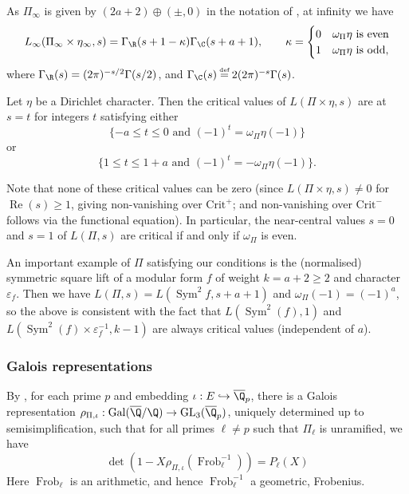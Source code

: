 \documentclass[10pt,reqno,a4paper]{amsart}
\newcommand{\GL}{\mathrm{GL}}
\begin{document}
As $\Pi_\infty$ is given by $(2a+2)\oplus(\pm,0)$ in the notation of \cite[\S3]{Kna94}, at infinity we have
\[
L_\infty(\Pi_\infty \times \eta_\infty, s) = \Gamma_\R(s + 1 - \kappa) \Gamma_{\C}(s + a + 1), \qquad \kappa = \begin{cases}0 & \omega_\Pi\eta\text{ is even}\\1 & \omega_\Pi\eta \text{ is odd,}\end{cases}
\]
where $\Gamma_{\R}(s) = (2\pi)^{-s/2}\Gamma(s/2)$, and $\Gamma_{\C}(s) \defeq 2(2\pi)^{-s}\Gamma(s)$.
\begin{proposition}
\label{prop:critical}
Let $\eta$ be a Dirichlet character. Then the critical values of $L(\Pi \times \eta, s)$ are at $s = t$ for integers $t$ satisfying either
\[ \{ -a \le t \le 0 \text{ and } (-1)^{t} = \omega_{\Pi}\eta(-1) \}\]
or
\[ \{ 1 \le t \le 1+a \text{ and } (-1)^{t} = -\omega_{\Pi}\eta(-1) \}.\]
\end{proposition}

Note that none of these critical values can be zero (since $L(\Pi \times \eta, s) \ne 0$ for $\operatorname{Re}(s) \ge 1$, giving non-vanishing over $\mathrm{Crit}^+$; and non-vanishing over $\mathrm{Crit}^-$ follows via the functional equation). In particular, the near-central values $s = 0$ and $s = 1$ of $L(\Pi, s)$ are critical if and only if $\omega_{\Pi}$ is even.

\begin{remark}
An important example of $\Pi$ satisfying our conditions is the (normalised) symmetric square lift of a modular form $f$ of weight $k = a + 2 \ge 2$ and character $\varepsilon_f$. Then we have $L(\Pi, s) = L(\operatorname{Sym}^2 f, s + a+1)$ and $\omega_{\Pi}(-1) = (-1)^a$, so the above is consistent with the fact that $L(\operatorname{Sym}^2(f), 1)$ and $L(\operatorname{Sym}^2(f) \times \varepsilon_f^{-1}, k-1)$ are always critical values (independent of $a$).
\end{remark}

\subsubsection{Galois representations}\label{sec:galois}
By \cite{HLTT}, for each prime $p$ and embedding $\iota: E \hookrightarrow \overline{\Q}_p$,  there is a Galois representation $\rho_{\Pi, \iota}: \operatorname{Gal}(\overline{\Q} / \Q) \to \GL_3(\overline{\Q}_p)$, uniquely determined up to semisimplification, such that for all primes $\ell \ne p$ such that $\Pi_\ell$ is unramified, we have
\[ \det(1 - X \rho_{\Pi, \iota}(\operatorname{Frob}_{\ell}^{-1})) = P_\ell(X)\]
Here $\operatorname{Frob}_\ell$ is an arithmetic, and hence $\operatorname{Frob}_{\ell}^{-1}$ a geometric, Frobenius.
\end{document}
